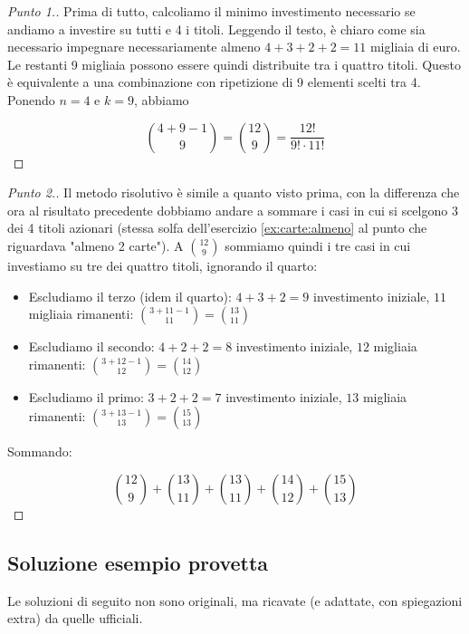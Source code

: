 \documentclass[12pt]{article}
\renewcommand\qedsymbol{$\square$}
\begin{document}
\begin{proof}[Punto 1.]
Prima di tutto, calcoliamo il minimo investimento necessario se andiamo a investire su tutti e 4 i titoli. Leggendo il testo, è chiaro come sia necessario impegnare necessariamente almeno $4 + 3 + 2 + 2 = 11$ migliaia di euro. Le restanti 9 migliaia possono essere quindi distribuite tra i quattro titoli. Questo è equivalente a una combinazione con ripetizione di 9 elementi scelti tra 4. Ponendo $n = 4$ e $k = 9$, abbiamo

$$
{4 + 9 - 1 \choose 9} = {12 \choose 9} = \frac{12!}{9! \cdot 11!}
$$
\end{proof}

\renewcommand\qedsymbol{$\blacksquare$}

\begin{proof}[Punto 2.]
Il metodo risolutivo è simile a quanto visto prima, con la differenza che ora al risultato precedente dobbiamo andare a sommare i casi in cui si scelgono 3 dei 4 titoli azionari (stessa solfa dell'esercizio \ref{ex:carte:almeno} al punto che riguardava "almeno 2 carte"). A ${12 \choose 9}$ sommiamo quindi i tre casi in cui investiamo su tre dei quattro titoli, ignorando il quarto:
\begin{itemize}
    \item Escludiamo il terzo (idem il quarto): $4+3+2=9$ investimento iniziale, $11$ migliaia rimanenti: ${3 + 11 - 1 \choose 11} = {13 \choose 11}$
    \item Escludiamo il secondo: $4+2+2=8$ investimento iniziale, $12$ migliaia rimanenti: ${3 + 12 - 1 \choose 12} = {14 \choose 12}$
    \item Escludiamo il primo: $3+2+2=7$ investimento iniziale, $13$ migliaia rimanenti: ${3 + 13 - 1 \choose 13} = {15 \choose 13}$
\end{itemize}

Sommando:

$$
{12 \choose 9} + {13 \choose 11} + {13 \choose 11} + {14 \choose 12} + {15 \choose 13}
$$

\end{proof}

\subsection{Soluzione esempio provetta}

Le soluzioni di seguito non sono originali, ma ricavate (e adattate, con spiegazioni extra) da quelle ufficiali.

\renewcommand\qedsymbol{$\square$}
\end{document}
